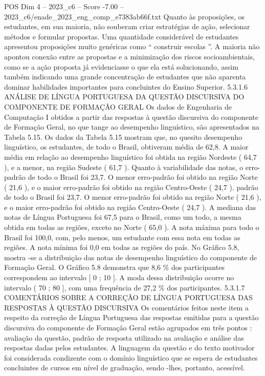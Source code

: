 \begin{textsample}{POS Dim 4 – 2023\_c6 – Score -7.00 – 2023\_c6/enade\_2023\_eng\_comp\_e7383ab66f.txt}
Quanto às proposições, os estudantes, em sua maioria, não souberam criar estratégias de ação, selecionar métodos e formular propostas.
Uma quantidade considerável de estudantes apresentou proposições muito genéricas como “ construir escolas ”.
A maioria não apontou conexão entre as propostas e a minimização dos riscos socioambientais, como se a ação proposta já evidenciasse o que ela está solucionando, assim também indicando uma grande concentração de estudantes que não aparenta dominar habilidades importantes para concluintes do Ensino Superior. 5.3.1.6 ANÁLISE DE LÍNGUA PORTUGUESA DA QUESTÃO DISCURSIVA DO COMPONENTE DE FORMAÇÃO GERAL Os dados de Engenharia de Computação I obtidos a partir das respostas à questão discursiva do componente de Formação Geral, no que tange ao desempenho linguístico, são apresentados na Tabela 5.15.
Os dados da Tabela 5.15 mostram que, no quesito desempenho linguístico, os estudantes, de todo o Brasil, obtiveram média de 62,8.
A maior média em relação ao desempenho linguístico foi obtida na região Nordeste ( 64,7 ), e a menor, na região Sudeste ( 61,7 ).
Quanto à variabilidade das notas, o erro-padrão de todo o Brasil foi 23,7.
O menor erro-padrão foi obtido na região Norte ( 21,6 ), e o maior erro-padrão foi obtido na região Centro-Oeste ( 24,7 ). padrão de todo o Brasil foi 23,7.
O menor erro-padrão foi obtido na região Norte ( 21,6 ), e o maior erro-padrão foi obtido na região Centro-Oeste ( 24,7 ).
A mediana das notas de Língua Portuguesa foi 67,5 para o Brasil, como um todo, a mesma obtida em todas as regiões, exceto no Norte ( 65,0 ).
A nota máxima para todo o Brasil foi 100,0, com, pelo menos, um estudante com essa nota em todas as regiões.
A nota mínima foi 0,0 em todas as regiões do país.
No Gráfico 5.8, mostra -se a distribuição das notas de desempenho linguístico do componente de Formação Geral.
O Gráfico 5.8 demonstra que 8,6 \% dos participantes correspondem ao intervalo [ 0 ; 10 ].
A moda dessa distribuição ocorre no intervalo ( 70 ; 80 ], com uma frequência de 27,2 \% dos participantes. 5.3.1.7 COMENTÁRIOS SOBRE A CORREÇÃO DE LÍNGUA PORTUGUESA DAS RESPOSTAS À QUESTÃO DISCURSIVA Os comentários feitos neste item a respeito da correção de Língua Portuguesa das respostas emitidas para a questão discursiva do componente de Formação Geral estão agrupados em três pontos : avaliação da questão, padrão de resposta utilizado na avaliação e análise das respostas dadas pelos estudantes.
A linguagem da questão e do texto motivador foi considerada condizente com o domínio linguístico que se espera de estudantes concluintes de cursos em nível de graduação, sendo -lhes, portanto, acessível.

\end{textsample}
